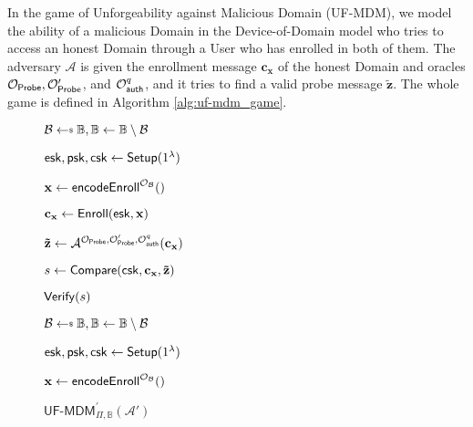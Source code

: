 In the game of Unforgeability against Malicious Domain (\textsf{UF-MDM}), we model the ability of a malicious {\sf Domain} in the Device-of-Domain model who tries to access an honest {\sf Domain} through a {\sf User} who has enrolled in both of them. The adversary $\mathcal{A}$ is given the enrollment message $\mathbf{c_x}$ of the honest {\sf Domain} and oracles $\mathcal{O}_{\sf Probe}, \mathcal{O}_{\sf Probe}^\prime$, and $ \mathcal{O}_{\sf auth}^q$, and it tries to find a valid probe message $\mathbf{\tilde{z}}$. The whole game is defined in Algorithm \ref{alg:uf-mdm_game}.


\begin{figure}[h]
\centering

	\begin{minipage}[t]{0.45\linewidth}
	\begin{algorithm}[H]
	\caption{${\textsf{UF-MDM}}_{\Pi, \mathbb{B}}(\mathcal{A})$}
	\label{alg:uf-mdm_game}
	\begin{algorithmic}[1]
		\State $\mathcal{B} \getsdollar \mathbb{B}, \mathbb{B} \gets \mathbb{B} \setminus \mathcal{B}$

		\State ${\sf esk}, {\sf psk}, {\sf csk} \gets {\sf Setup}(1^\lambda)$

		\State $\mathbf{x} \gets {\sf encodeEnroll}^{\mathcal{O}_{\mathcal{B}}}()$

		\State $\mathbf{c_x} \gets {\sf Enroll}({\sf esk}, \mathbf{x})$

		\State ${\mathbf{\tilde{z}}} \gets \mathcal{A}^{ \mathcal{O}_{\sf Probe}, \mathcal{O}_{\sf Probe}^\prime, \mathcal{O}_{\sf auth}^q } ( \mathbf{c_x} )$

		\State $s \gets {\sf Compare}( {\sf csk}, \mathbf{c_x}, \mathbf{\tilde{z}} )$

		\State \Return ${\sf Verify}(s)$
	\end{algorithmic}
	\end{algorithm}
	\end{minipage}
	\begin{minipage}[t]{0.45\linewidth}
	\begin{algorithm}[H]
	\caption{${\textsf{UF-MDM}}^\prime_{\Pi, \mathbb{B}}(\mathcal{A'})$}
	\label{alg:plain_uf-mdm_game}
	\begin{algorithmic}[1]
		\State $\mathcal{B} \getsdollar \mathbb{B}, \mathbb{B} \gets \mathbb{B} \setminus \mathcal{B}$

		\State ${\sf esk}, {\sf psk}, {\sf csk} \gets {\sf Setup}(1^\lambda)$

		\State $\mathbf{x} \gets {\sf encodeEnroll}^{\mathcal{O}_{\mathcal{B}}}()$


\end{algorithmic}
\end{algorithm}
\end{minipage}
\end{figure}
